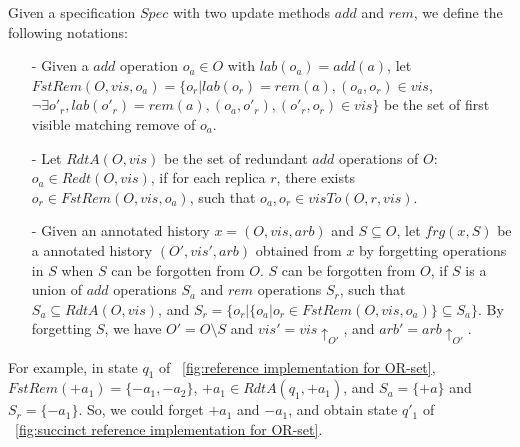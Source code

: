 Given a specification $\mathit{Spec}$ with two update methods $\mathit{add}$ and $\mathit{rem}$, we define the following notations:

\begin{itemize}
\setlength{\itemsep}{0.5pt}
\item[-] Given a $\mathit{add}$ operation $o_a \in O$ with $lab(o_a)= \mathit{add}(a)$, let $\mathit{FstRem}(O,\mathit{vis},o_a) = \{ o_r \vert lab(o_r)=\mathit{rem}(a),(o_a,o_r) \in \mathit{vis}$, $ \neg \exists o'_r, lab(o'_r) = rem(a), (o_a,o'_r),(o'_r,o_r) \in \mathit{vis} \}$ be the set of first visible matching remove of $o_a$.

\item[-] Let $\mathit{RdtA}(O,\mathit{vis})$ be the set of redundant $add$ operations of $O$: $o_a\in \mathit{Redt}(O,\mathit{vis})$, if for each replica $r$, there exists $o_r \in \mathit{FstRem}(O,\mathit{vis},o_a)$, such that $o_a,o_r \in \mathit{visTo}(O,r,\mathit{vis})$.

\item[-] Given an annotated history $x = (O,\mathit{vis},\mathit{arb})$ and $S \subseteq O$, let $\mathit{frg}(x,S)$ be a annotated history $(O',\mathit{vis}',\mathit{arb})$ obtained from $x$ by forgetting operations in $S$ when $S$ can be forgotten from $O$. $S$ can be forgotten from $O$, if $S$ is a union of $\mathit{add}$ operations $S_a$ and $\mathit{rem}$ operations $S_r$, such that $S_a \subseteq \mathit{RdtA}(O,\mathit{vis})$, and $S_r = \{ o_r \vert  \{ o_a \vert o_r \in \mathit{FstRem}(O,\mathit{vis},o_a) \} \subseteq S_a \}$. By forgetting $S$, we have $O' = O \setminus S$ and $\mathit{vis}' = \mathit{vis} \uparrow_{O'}$, and $\mathit{arb}' = \mathit{arb} \uparrow_{O'}$.
\end{itemize}

{\color {red} For example, in state $q_1$ of \figurename~\ref{fig:reference implementation for OR-set}, $\mathit{FstRem}(+a_1) = \{ -a_1,-a_2 \}$, $+a_1 \in \mathit{RdtA}(q_1,+a_1)$, and $S_a = \{ +a \}$ and $S_r = \{ -a_1 \}$. So, we could forget $+a_1$ and $-a_1$, and obtain state $q'_1$ of \figurename~\ref{fig:succinct reference implementation for OR-set}.}


